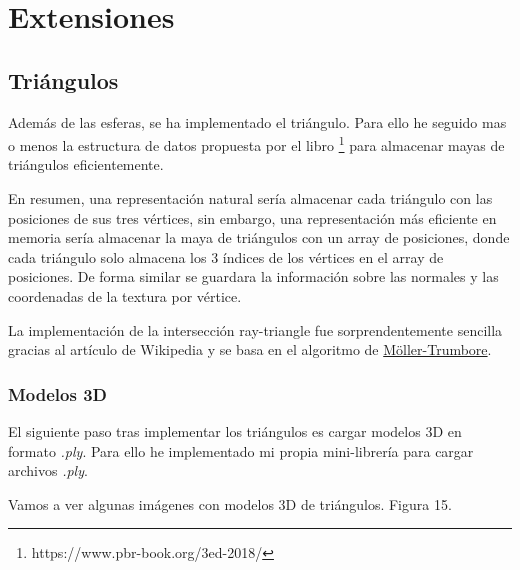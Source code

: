 \documentclass{article}
\begin{document}
\section{Extensiones}
\subsection{Triángulos}
Además de las esferas, se ha implementado el triángulo. Para ello he seguido mas
o menos la estructura de datos propuesta por el libro \cite{PBRT3e} \footnote{https://www.pbr-book.org/3ed-2018/}
para almacenar mayas de triángulos eficientemente.

En resumen, una representación natural sería almacenar cada triángulo con las
posiciones de sus tres vértices, sin embargo, una representación más eficiente
en memoria sería almacenar la maya de triángulos con un array de posiciones,
donde cada triángulo solo almacena los 3 índices de los vértices en el array de posiciones. De forma similar se guardara la información sobre las normales y las coordenadas de la textura por vértice.

La implementación de la intersección ray-triangle fue sorprendentemente sencilla
gracias al artículo de Wikipedia y se basa en el algoritmo de
\href{https://en.wikipedia.org/wiki/M%C3%B6ller%E2%80%93Trumbore_intersection_algorithm}{Möller-Trumbore}.

\subsubsection{Modelos 3D}
El siguiente paso tras implementar los triángulos es cargar modelos 3D en
formato \textit{.ply}. Para ello he implementado mi propia mini-librería para
cargar archivos \textit{.ply}.

Vamos a ver algunas imágenes con modelos 3D de triángulos. Figura 15.
\end{document}
